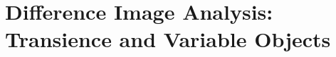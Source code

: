\section{Difference Image Analysis: Transience and Variable Objects}
\label{sec:dia_transient_variable}